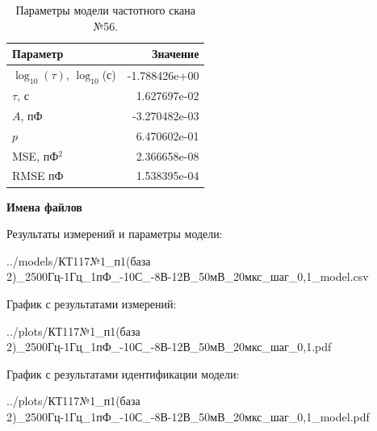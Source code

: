\begin{table}[!ht]
    \centering
    \caption{Параметры модели частотного скана №56.}
    \begin{tabular}{|l|r|}
        \hline
        Параметр                                       & Значение                  \\ \hline
        $\log_{10}(\tau)$, $\log_{10}$(с)              & -1.788426e+00             \\ \hline
        $\tau$, с                                      & 1.627697e-02              \\ \hline
        $A$, пФ                                        & -3.270482e-03             \\ \hline
        $p$                                            & 6.470602e-01              \\ \hline
        MSE, пФ$^2$                                    & 2.366658e-08              \\ \hline
        RMSE пФ                                        & 1.538395e-04              \\ \hline
    \end{tabular}
    \label{table:frequency_scan_model_56}
\end{table}

\textbf{Имена файлов}

Результаты измерений и параметры модели:

\scriptsize../models/КТ117№1\_п1(база 2)\_2500Гц-1Гц\_1пФ\_-10С\_-8В-12В\_50мВ\_20мкс\_шаг\_0,1\_model.csv
\normalsize

График с результатами измерений:

\scriptsize../plots/КТ117№1\_п1(база 2)\_2500Гц-1Гц\_1пФ\_-10С\_-8В-12В\_50мВ\_20мкс\_шаг\_0,1.pdf
\normalsize

График с результатами идентификации модели:

\scriptsize../plots/КТ117№1\_п1(база 2)\_2500Гц-1Гц\_1пФ\_-10С\_-8В-12В\_50мВ\_20мкс\_шаг\_0,1\_model.pdf
\normalsize

